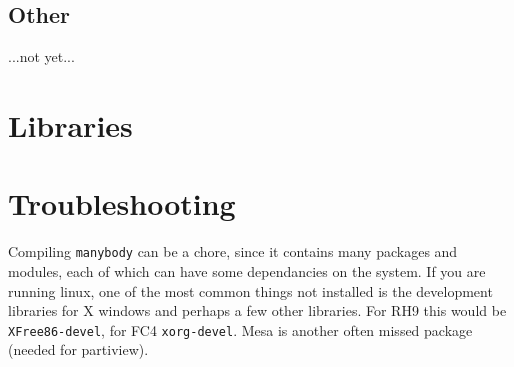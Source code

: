 \section{Other}

...not yet...

\chapter                {Libraries}


\chapter                {Troubleshooting}

Compiling {\tt manybody} can be a chore, since it contains many packages
and modules, each of which can have some dependancies on the system.
If you are running linux, one of the most common things not installed
is the development libraries for X windows and perhaps a few other libraries.
For RH9 this would be {\tt  XFree86-devel}, for FC4 {\tt xorg-devel}.
Mesa is another often missed package (needed for partiview).

